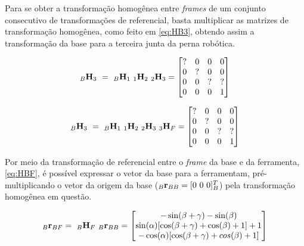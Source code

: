 Para se obter a transformação homogênea entre \textit{frames} de um conjunto consecutivo de transformações de referencial, basta multiplicar as matrizes de transformação homogênea, como feito em \eqref{eq:HB3}, obtendo assim a transformação da base para a terceira junta da perna robótica.

\begin{equation}\label{eq:HB3}
	_B \mathbf{H}_3 \ = \ _B \mathbf{H}_1 \  _1 \mathbf{H}_2  \ _2 \mathbf{H}_3 = \begin{bmatrix}
		? & 0  & 0      &  0 \\
		0 & ?  & 0      &  0 \\
		0 & 0  & ?      &  ? \\
		0 & 0  & 0      &  1
	\end{bmatrix}
\end{equation}

\begin{equation}\label{eq:HBF}
	_B \mathbf{H}_3 \ = \ _B \mathbf{H}_1 \  _1 \mathbf{H}_2  \ _2 \mathbf{H}_3  \ _3 \mathbf{H}_F = \begin{bmatrix}
		? & 0  & 0      &  0 \\
		0 & ?  & 0      &  0 \\
		0 & 0  & ?      &  ? \\
		0 & 0  & 0      &  1
	\end{bmatrix}
\end{equation}

Por meio da transformação de referencial entre o \textit{frame} da base e da ferramenta, \eqref{eq:HBF}, é possível expressar o vetor da base para a ferramentam, pré-multiplicando o vetor da origem da base ($_B\mathbf{r}_{BB} = [0 \ 0 \ 0]^T_B$) pela transformação homogênea em questão.

\begin{equation}\label{eq:r_BF_inB}
	_B \mathbf{r}_{BF} = \ _B\mathbf{H}_F \ _B\mathbf{r}_{BB} = \begin{bmatrix} - \sin(\beta + \gamma) - \sin(\beta) \\ \sin(\alpha)[\cos(\beta + \gamma) + \cos(\beta) + 1] + 1  \\ -\cos(\alpha)[\cos(\beta + \gamma) + cos(\beta) + 1] \end{bmatrix}
\end{equation}





\section{}

